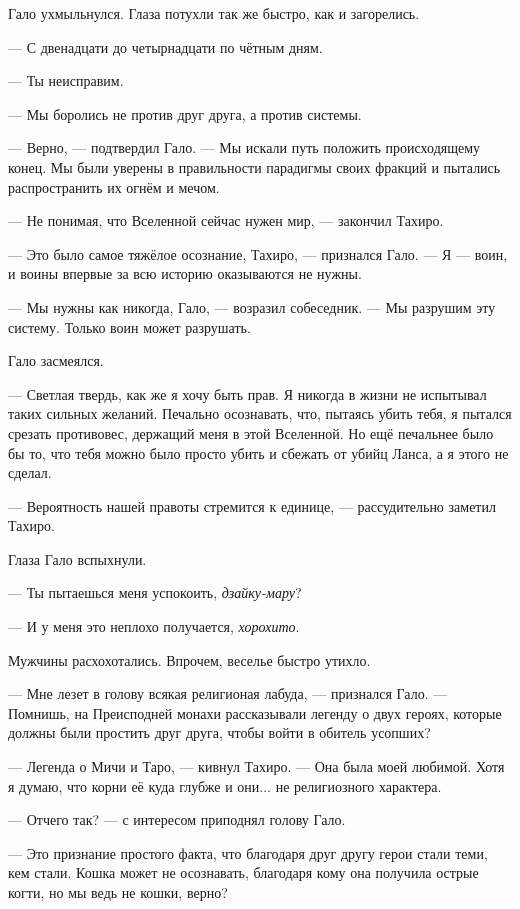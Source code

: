 Гало ухмыльнулся.
Глаза потухли так же быстро, как и загорелись.

--- С двенадцати до четырнадцати по чётным дням.

--- Ты неисправим.

\textspace

--- Мы боролись не против друг друга, а против системы.

--- Верно, --- подтвердил Гало.
--- Мы искали путь положить происходящему конец.
Мы были уверены в правильности парадигмы своих фракций и пытались распространить их огнём и мечом.

--- Не понимая, что Вселенной сейчас нужен мир, --- закончил Тахиро.

--- Это было самое тяжёлое осознание, Тахиро, --- признался Гало.
--- Я --- воин, и воины впервые за всю историю оказываются не нужны.

--- Мы нужны как никогда, Гало, --- возразил собеседник.
--- Мы разрушим эту систему.
Только воин может разрушать.

Гало засмеялся.

--- Светлая твердь, как же я хочу быть прав.
Я никогда в жизни не испытывал таких сильных желаний.
Печально осознавать, что, пытаясь убить тебя, я пытался срезать противовес, держащий меня в этой Вселенной.
Но ещё печальнее было бы то, что тебя можно было просто убить и сбежать от убийц Ланса, а я этого не сделал.

--- Вероятность нашей правоты стремится к единице, --- рассудительно заметил Тахиро.

Глаза Гало вспыхнули.

--- Ты пытаешься меня успокоить, \emph{дзайку-мару}?

--- И у меня это неплохо получается, \emph{хорохито}.

Мужчины расхохотались.
Впрочем, веселье быстро утихло.

--- Мне лезет в голову всякая религионая лабуда, --- признался Гало.
--- Помнишь, на Преисподней монахи рассказывали легенду о двух героях, которые должны были простить друг друга, чтобы войти в обитель усопших?

--- Легенда о Мичи и Таро, --- кивнул Тахиро.
--- Она была моей любимой.
Хотя я думаю, что корни её куда глубже и они... не религиозного характера.

--- Отчего так? --- с интересом приподнял голову Гало.

--- Это признание простого факта, что благодаря друг другу герои стали теми, кем стали.
Кошка может не осознавать, благодаря кому она получила острые когти, но мы ведь не кошки, верно?

